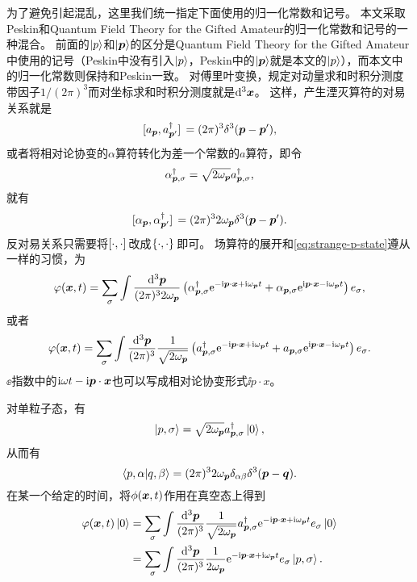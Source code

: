为了避免引起混乱，这里我们统一指定下面使用的归一化常数和记号。
本文采取Peskin和Quantum Field Theory for the Gifted Amateur的归一化常数和记号的一种混合。
前面的$\ket{p}$和$\ket{\vb*{p}}$的区分是Quantum Field Theory for the Gifted Amateur中使用的记号（Peskin中没有引入$\ket{p}$，Peskin中的$\ket{\vb*{p}}$就是本文的$\ket{p}$），而本文中的归一化常数则保持和Peskin一致。
对傅里叶变换，规定对动量求和时积分测度带因子$1/(2\pi)^3$而对坐标求和时积分测度就是$\dd[3]{\vb*{x}}$。
这样，产生湮灭算符的对易关系就是
\begin{equation}
    \comm*{{a}_{\vb*{p}}}{{a}^\dagger_{\vb*{p}'}} = (2\pi)^3 \delta^3 (\vb*{p} - \vb*{p}'),
\end{equation}
或者将相对论协变的$\alpha$算符转化为差一个常数的$a$算符，即令
\begin{equation}
    \alpha^\dagger_{\vb*{p}, \sigma} = \sqrt{2 \omega_{\vb*{p}}} a^\dagger_{\vb*{p}, \sigma},
\end{equation}
就有
\begin{equation}
    \comm*{{\alpha}_{\vb*{p}}}{{\alpha}^\dagger_{\vb*{p}'}} = (2\pi)^3 2 \omega_{\vb*{p}} \delta^3 (\vb*{p} - \vb*{p}').
\end{equation}
反对易关系只需要将$\comm*{\cdot}{\cdot}$改成$\acomm*{\cdot}{\cdot}$即可。
场算符的展开和\eqref{eq:strange-p-state}遵从一样的习惯，为
\begin{equation}
    \varphi(\vb*{x}, t) = \sum_{\sigma} \int \frac{\dd[3]{\vb*{p}}}{(2\pi)^3 2 \omega_{\vb*{p}}} \left( {\alpha}^\dagger_{\vb*{p}, \sigma} \mathrm{e}^{- \mathrm{i} \vb*{p} \cdot \vb*{x} + \mathrm{i} \omega_{\vb*{p}} t} + {\alpha}_{\vb*{p}, \sigma} \mathrm{e}^{\mathrm{i} \vb*{p} \cdot \vb*{x} - \mathrm{i} \omega_{\vb*{p}} t} \right) e_\sigma,
\end{equation}
或者
\begin{equation}
    {\varphi}(\vb*{x}, t) = \sum_\sigma \int \frac{\dd[3]{\vb*{p}}}{(2\pi)^3} \frac{1}{\sqrt{2 \omega_{\vb*{p}}}} \left( {a}^\dagger_{\vb*{p}, \sigma} \mathrm{e}^{- \mathrm{i} \vb*{p} \cdot \vb*{x} + \mathrm{i} \omega_{\vb*{p}} t} + {a}_{\vb*{p}, \sigma} \mathrm{e}^{\mathrm{i} \vb*{p} \cdot \vb*{x} - \mathrm{i} \omega_{\vb*{p}} t} \right) e_\sigma. 
    \label{eq:field-operator-fourier}
\end{equation}
$\ee$指数中的$\mathrm{i} \omega t - \mathrm{i} \vb*{p} \cdot \vb*{x}$也可以写成相对论协变形式$\ii p \cdot x$。

对单粒子态，有
\[
    \ket{p, \sigma} = \sqrt{2 \omega_{\vb*{p}}} {a}^\dagger_{\vb*{p}, \sigma} \ket{0},
\]
从而有
\begin{equation}
    \braket{p, \alpha}{q, \beta} = (2\pi)^3 2 \omega_{\vb*{p}} \delta_{\alpha \beta} \delta^3(\vb*{p} - \vb*{q}).
\end{equation}
在某一个给定的时间，将${\phi}(\vb*{x}, t)$作用在真空态上得到
\[
    \begin{aligned}
        {\varphi}(\vb*{x}, t) \ket{0} &= \sum_\sigma \int \frac{\dd[3]{\vb*{p}}}{(2\pi)^3} \frac{1}{\sqrt{2 \omega_{\vb*{p}}}} {a}^\dagger_{\vb*{p}, \sigma} \mathrm{e}^{- \mathrm{i} \vb*{p} \cdot \vb*{x} + \mathrm{i} \omega_{\vb*{p}} t} e_{\sigma} \ket{0} \\
        &= \sum_\sigma \int \frac{\dd[3]{\vb*{p}}}{(2\pi)^3} \frac{1}{2 \omega_{\vb*{p}}} \mathrm{e}^{- \mathrm{i} \vb*{p} \cdot \vb*{x} + \mathrm{i} \omega_{\vb*{p}} t} e_{\sigma} \ket{p, \sigma}.
    \end{aligned}
\]

